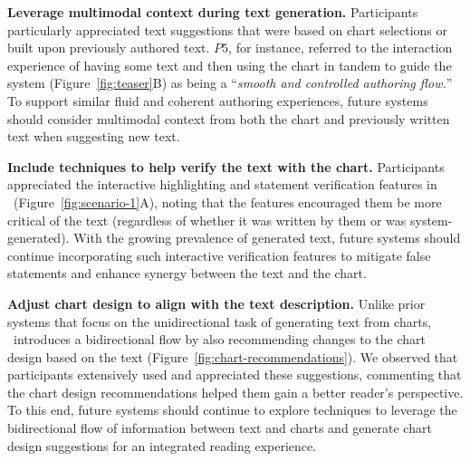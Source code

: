 \vspace{.5em}
\noindent\textbf{Leverage multimodal context during text generation.}
Participants particularly appreciated text suggestions that were based on chart selections or built upon previously authored text.
$P5$, for instance, referred to the interaction experience of having some text and then using the chart in tandem to guide the system (Figure~\ref{fig:teaser}B) as being a ``\textit{smooth and controlled authoring flow.}'' To support similar fluid and coherent authoring experiences, future systems should consider multimodal context from both the chart and previously written text when suggesting new text.

\vspace{.5em}
\noindent\textbf{Include techniques to help verify the text with the chart.}
Participants appreciated the interactive highlighting and statement verification features in \pluto~(Figure~\ref{fig:scenario-1}A), noting that the features encouraged them be more critical of the text (regardless of whether it was written by them or was system-generated).
With the growing prevalence of generated text, future systems should continue incorporating such interactive verification features to mitigate false statements and enhance synergy between the text and the chart.

\vspace{.5em}
\noindent\textbf{Adjust chart design to align with the text description.}
Unlike prior systems that focus on the unidirectional task of generating text from charts, \pluto~introduces a bidirectional flow by also recommending changes to the chart design based on the text (Figure~\ref{fig:chart-recommendations}).
We observed that participants extensively used and appreciated these suggestions, commenting that the chart design recommendations helped them gain a better reader's perspective.
To this end, future systems should continue to explore techniques to leverage the bidirectional flow of information between text and charts
and generate chart design suggestions for an integrated reading experience.

